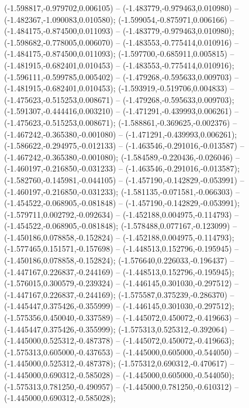  (-1.598817,-0.979702,0.006105) -- (-1.483779,-0.979463,0.010980) -- (-1.482367,-1.090083,0.010580);
 (-1.599054,-0.875971,0.006166) -- (-1.484175,-0.874500,0.011093) -- (-1.483779,-0.979463,0.010980);
 (-1.598682,-0.778005,0.006070) -- (-1.483553,-0.775414,0.010916) -- (-1.484175,-0.874500,0.011093);
 (-1.597700,-0.685911,0.005815) -- (-1.481915,-0.682401,0.010453) -- (-1.483553,-0.775414,0.010916);
 (-1.596111,-0.599785,0.005402) -- (-1.479268,-0.595633,0.009703) -- (-1.481915,-0.682401,0.010453);
 (-1.593919,-0.519706,0.004833) -- (-1.475623,-0.515253,0.008671) -- (-1.479268,-0.595633,0.009703);
 (-1.591307,-0.444416,0.003210) -- (-1.471291,-0.439993,0.006261) -- (-1.475623,-0.515253,0.008671);
 (-1.588861,-0.369625,-0.002376) -- (-1.467242,-0.365380,-0.001080) -- (-1.471291,-0.439993,0.006261);
 (-1.586622,-0.294975,-0.012133) -- (-1.463546,-0.291016,-0.013587) -- (-1.467242,-0.365380,-0.001080);
 (-1.584589,-0.220436,-0.026046) -- (-1.460197,-0.216850,-0.031233) -- (-1.463546,-0.291016,-0.013587);
 (-1.582760,-0.145981,-0.044105) -- (-1.457190,-0.142829,-0.053991) -- (-1.460197,-0.216850,-0.031233);
 (-1.581135,-0.071581,-0.066303) -- (-1.454522,-0.068905,-0.081848) -- (-1.457190,-0.142829,-0.053991);
 (-1.579711,0.002792,-0.092634) -- (-1.452188,0.004975,-0.114793) -- (-1.454522,-0.068905,-0.081848);
 (-1.578488,0.077167,-0.123099) -- (-1.450186,0.078858,-0.152824) -- (-1.452188,0.004975,-0.114793);
 (-1.577465,0.151571,-0.157698) -- (-1.448513,0.152796,-0.195945) -- (-1.450186,0.078858,-0.152824);
 (-1.576640,0.226033,-0.196437) -- (-1.447167,0.226837,-0.244169) -- (-1.448513,0.152796,-0.195945);
 (-1.576015,0.300579,-0.239324) -- (-1.446145,0.301030,-0.297512) -- (-1.447167,0.226837,-0.244169);
 (-1.575587,0.375239,-0.286370) -- (-1.445447,0.375426,-0.355999) -- (-1.446145,0.301030,-0.297512);
 (-1.575356,0.450040,-0.337589) -- (-1.445072,0.450072,-0.419663) -- (-1.445447,0.375426,-0.355999);
 (-1.575313,0.525312,-0.392064) -- (-1.445000,0.525312,-0.487378) -- (-1.445072,0.450072,-0.419663);
 (-1.575313,0.605000,-0.437653) -- (-1.445000,0.605000,-0.544050) -- (-1.445000,0.525312,-0.487378);
 (-1.575312,0.690312,-0.470617) -- (-1.445000,0.690312,-0.585028) -- (-1.445000,0.605000,-0.544050);
 (-1.575313,0.781250,-0.490957) -- (-1.445000,0.781250,-0.610312) -- (-1.445000,0.690312,-0.585028);
